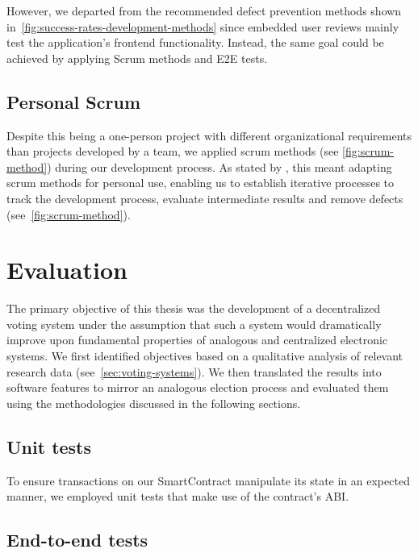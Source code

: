 However, we departed from the recommended defect prevention methods shown in~\cref{fig:success-rates-development-methods} since embedded user reviews mainly test the application’s frontend functionality.
Instead, the same goal could be achieved by applying Scrum methods and \gls{E2E} tests.

\subsection{Personal Scrum}\label{subsec:personal-scrum}

Despite this being a one-person project with different organizational requirements than projects developed by a team, we applied scrum methods (see \cref{fig:scrum-method}) during our development process.
As stated by \textcites{andrews_scrum_2017}{pahuja_scrum_2015}, this meant adapting scrum methods for personal use, enabling us to establish iterative processes to track the development process, evaluate intermediate results and remove defects (see~\cref{fig:scrum-method}).


\section{Evaluation}\label{sec:evaluation}

The primary objective of this thesis was the development of a decentralized voting system under the assumption that such a system would dramatically improve upon fundamental properties of analogous and centralized electronic systems.
We first identified objectives based on a qualitative analysis of relevant research data (see~\cref{sec:voting-systems}).
We then translated the results into software features to mirror an analogous election process and evaluated them using the methodologies discussed in the following sections.

\subsection{Unit tests}\label{subsec:unit-tests}

To ensure transactions on our \gls{SmartContract} manipulate its state in an expected manner, we employed unit tests that make use of the contract's \gls{ABI}.

\subsection{End-to-end tests}\label{subsec:end-to-end-tests}

